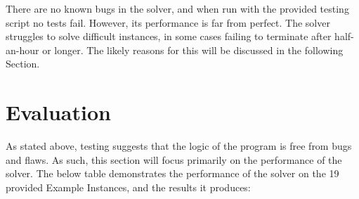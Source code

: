 \documentclass[11pt]{article}
\begin{document}
		There are no known bugs in the solver, and when run with the provided testing script no tests fail.
		However, its performance is far from perfect.
		The solver struggles to solve difficult instances, in some cases failing to terminate after half-an-hour or longer.
		The likely reasons for this will be discussed in the following Section.

	\section{Evaluation}

		As stated above, testing suggests that the logic of the program is free from bugs and flaws.
		As such, this section will focus primarily on the performance of the solver.
		The below table demonstrates the performance of the solver on the 19 provided Example Instances,
		and the results it produces:
\end{document}
